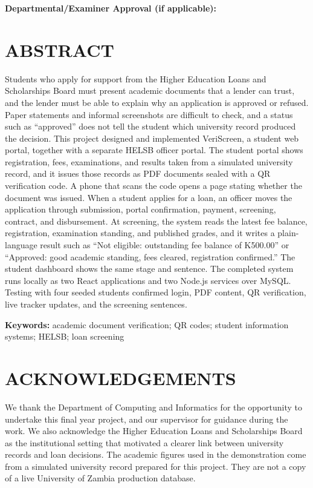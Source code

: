 \documentclass[12pt,a4paper]{report}
\begin{document}
\vspace{1cm}
\noindent\textbf{Departmental/Examiner Approval (if applicable):} \hrulefill

\clearpage

\chapter*{ABSTRACT}

Students who apply for support from the Higher Education Loans and Scholarships Board must present academic documents that a lender can trust, and the lender must be able to explain why an application is approved or refused. Paper statements and informal screenshots are difficult to check, and a status such as ``approved'' does not tell the student which university record produced the decision. This project designed and implemented VeriScreen, a student web portal, together with a separate HELSB officer portal. The student portal shows registration, fees, examinations, and results taken from a simulated university record, and it issues those records as PDF documents sealed with a QR verification code. A phone that scans the code opens a page stating whether the document was issued. When a student applies for a loan, an officer moves the application through submission, portal confirmation, payment, screening, contract, and disbursement. At screening, the system reads the latest fee balance, registration, examination standing, and published grades, and it writes a plain-language result such as ``Not eligible: outstanding fee balance of K500.00'' or ``Approved: good academic standing, fees cleared, registration confirmed.'' The student dashboard shows the same stage and sentence. The completed system runs locally as two React applications and two Node.js services over MySQL. Testing with four seeded students confirmed login, PDF content, QR verification, live tracker updates, and the screening sentences.

\noindent\textbf{Keywords:} academic document verification; QR codes; student information systems; HELSB; loan screening

\clearpage

\chapter*{ACKNOWLEDGEMENTS}

We thank the Department of Computing and Informatics for the opportunity to undertake this final year project, and our supervisor for guidance during the work. We also acknowledge the Higher Education Loans and Scholarships Board as the institutional setting that motivated a clearer link between university records and loan decisions. The academic figures used in the demonstration come from a simulated university record prepared for this project. They are not a copy of a live University of Zambia production database.
\end{document}

